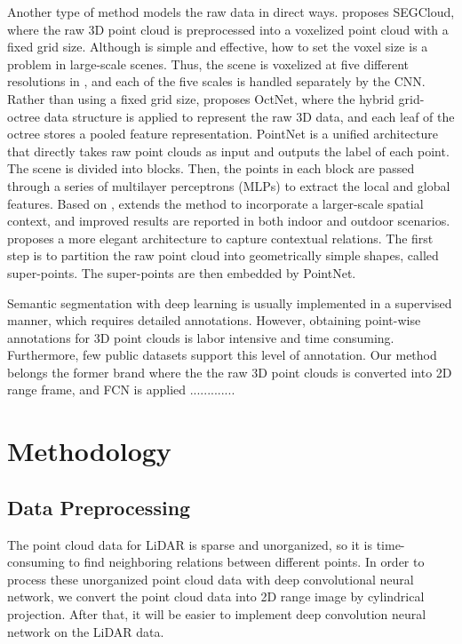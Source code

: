 	Another type of method models the raw data in direct ways. \cite{tchapmi2017segcloud} proposes SEGCloud, where the raw 3D point cloud is preprocessed into a voxelized point cloud with a fixed grid size. Although \cite{tchapmi2017segcloud} is simple and effective, how to set the voxel size is a problem in large-scale scenes. Thus, the scene is voxelized at five different resolutions in \cite{hackel2017isprs}, and each of the five scales is handled separately by the CNN. Rather than using a fixed grid size, \cite{riegler2017octnet} proposes OctNet, where the hybrid grid-octree data structure is applied to represent the raw 3D data, and each leaf of the octree stores a pooled feature representation. PointNet\cite{qi2017pointnet} is a unified architecture that directly takes raw point clouds as input and outputs the label of each point. The scene is divided into blocks. Then, the points in each block are passed through a series of multilayer perceptrons (MLPs) to extract the local and global features. Based on \cite{qi2017pointnet}, \cite{engelmann2017exploring} extends the method to incorporate a larger-scale spatial context, and improved results are reported in both indoor and outdoor scenarios. \cite{landrieu2017large} proposes a more elegant architecture to capture contextual relations. The first step is to partition the raw point cloud into geometrically simple shapes, called super-points. The super-points are then embedded by PointNet\cite{qi2017pointnet}.
	
	Semantic segmentation with deep learning is usually implemented in a supervised manner, which requires detailed annotations. However, obtaining point-wise annotations for 3D point clouds is labor intensive and time consuming. Furthermore, few public datasets support this level of annotation. Our method belongs the former brand where the the raw 3D point clouds is converted into 2D range frame, and FCN is applied .............

\section{Methodology}

\subsection{Data Preprocessing}
The point cloud data for LiDAR is sparse and unorganized, so it is time-consuming to find neighboring relations between different points. In order to process these unorganized point cloud data with deep convolutional neural network, we convert the point cloud data into 2D range image by cylindrical projection. After that, it will be easier to implement deep convolution neural network on the LiDAR data.


